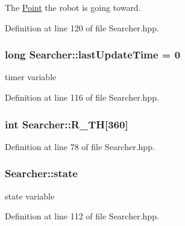 The \hyperlink{classPoint}{Point} the robot is going toward. 



Definition at line 120 of file Searcher.\-hpp.

\hypertarget{classSearcher_a91de3c7ecdda8d3a6d231c35fbf363c5}{
\subsubsection[{last\-Update\-Time}]{\setlength{\rightskip}{0pt plus 5cm}long Searcher\-::last\-Update\-Time = 0\hspace{0.3cm}{\ttfamily [private]}}}\label{classSearcher_a91de3c7ecdda8d3a6d231c35fbf363c5}


timer variable 



Definition at line 116 of file Searcher.\-hpp.

\hypertarget{classSearcher_ab21f940dc1ed76c01611be56b95961e1}{
\subsubsection[{R\-\_\-\-T\-H}]{\setlength{\rightskip}{0pt plus 5cm}int Searcher\-::\-R\-\_\-\-T\-H\mbox{[}360\mbox{]}\hspace{0.3cm}{\ttfamily [private]}}}\label{classSearcher_ab21f940dc1ed76c01611be56b95961e1}


Definition at line 78 of file Searcher.\-hpp.

\hypertarget{classSearcher_aadc83ce2d77610d6572f98ecd8b4d6e4}{
\subsubsection[{state}]{ Searcher\-::state\hspace{0.3cm}{\ttfamily [private]}}}\label{classSearcher_aadc83ce2d77610d6572f98ecd8b4d6e4}


state variable 



Definition at line 112 of file Searcher.\-hpp.

